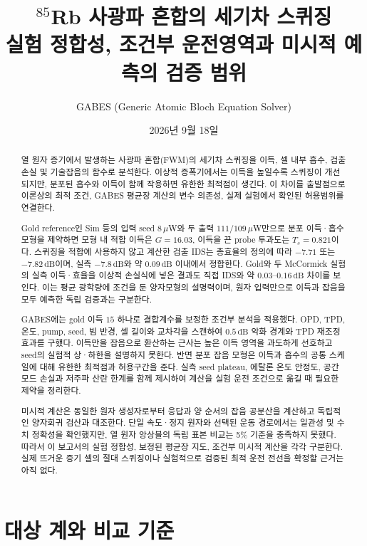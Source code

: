 \documentclass[11pt,a4paper]{article}
\title{\textbf{$^{85}$Rb 사광파 혼합의 세기차 스퀴징}\\[8pt]
\large 실험 정합성, 조건부 운전영역과 미시적 예측의 검증 범위}
\author{GABES (Generic Atomic Bloch Equation Solver)}
\date{2026년 9월 18일}
\newcommand{\dB}{\,\mathrm{dB}}
\begin{document}
\maketitle
\begin{abstract}
열 원자 증기에서 발생하는 사광파 혼합(FWM)의 세기차 스퀴징을 이득, 셀 내부
흡수, 검출 손실 및 기술잡음의 함수로 분석한다. 이상적 증폭기에서는 이득을
높일수록 스퀴징이 개선되지만, 분포된 흡수와 이득이 함께 작용하면 유한한
최적점이 생긴다. 이 차이를 출발점으로 이론상의 최적 조건, GABES 평균장
계산의 변수 의존성, 실제 실험에서 확인된 허용범위를 연결한다.

Gold reference인 Sim 등\cite{sim}의 입력 seed $8\,\mu$W와 두 출력
$111/109\,\mu$W만으로 분포 이득·흡수 모형을 제약하면 모형 내 적합 이득은
$G=16.03$, 이득을 끈 probe 투과도는 $T_s=0.821$이다. 스퀴징을 적합에
사용하지 않고 계산한 검출 IDS는 총효율의 정의에 따라 $-7.71$ 또는
$-7.82\dB$이며, 실측 $-7.8\dB$와 약 $0.09\dB$ 이내에서 정합한다.
Gold와 두 McCormick 실험의 실측 이득·효율을 이상적 손실식에 넣은 결과도
직접 IDS와 약 $0.03$--$0.16\dB$ 차이를 보인다. 이는 평균 광학량에 조건을
둔 양자모형의 설명력이며, 원자 입력만으로 이득과 잡음을 모두 예측한
독립 검증과는 구분한다.

GABES에는 gold 이득 $15$ 하나로 결합계수를 보정한 조건부 분석을 적용했다.
OPD, TPD, 온도, pump, seed, 빔 반경, 셀 길이와 교차각을 스캔하여
$0.5\dB$ 악화 경계와 TPD 재조정 효과를 구했다. 이득만을 잡음으로 환산하는
근사는 높은 이득 영역을 과도하게 선호하고 seed의 실험적 상·하한을 설명하지
못한다. 반면 분포 잡음 모형은 이득과 흡수의 공통 스케일에 대해 유한한
최적점과 허용구간을 준다. 실측 seed plateau, 에탈론 온도 안정도,
공간모드 손실과 저주파 산란 한계를 함께 제시하여 계산을 실험 운전 조건으로
옮길 때 필요한 제약을 정리한다.


미시적 계산은 동일한 원자 생성자로부터 응답과 양 순서의 잡음 공분산을
계산하고 독립적인 양자회귀 검산과 대조한다. 단일 속도·정지 원자와 선택된
운동 경로에서는 일관성 및 수치 정확성을 확인했지만, 열 원자 앙상블의
독립 표본 비교는 5\% 기준을 충족하지 못했다. 따라서 이 보고서의
실험 정합성, 보정된 평균장 지도, 조건부 미시적 계산을 각각 구분한다.
실제 뜨거운 증기 셀의 절대 스퀴징이나 실험적으로 검증된 최적 운전 전선을
확정할 근거는 아직 없다.
\end{abstract}
\clearpage
\begingroup\fontsize{10}{10.5}\selectfont\setlength{\parskip}{0pt}\tableofcontents\endgroup
\clearpage

\section{대상 계와 비교 기준}
\end{document}
